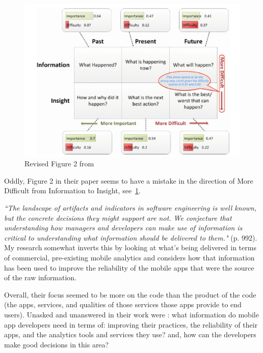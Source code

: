 \begin{figure}
    \centering
    \includegraphics[width=\linewidth]{images/related-work/buse2012-edited-figure-2.pdf}
    \caption[Analytical questions, adapted from \cite{buse2012_information_needs_for_software_development_analytics}]{Revised Figure 2 from \cite{buse2012_information_needs_for_software_development_analytics}}
    \label{fig:buse2012-edited-figure-2}
\end{figure}

Oddly, Figure 2 in their paper seems to have a mistake in the direction of More Difficult from Information to Insight, see~\ref{fig:buse2012-edited-figure-2}.

\emph{``The landscape of artifacts and indicators in software engineering is well known, but the concrete decisions they might support are not. We conjecture that understanding how managers and developers can make use of information is critical to understanding what information should be delivered to them."} (p. 992). 
My research somewhat inverts this by looking at what's being delivered in terms of commercial, pre-existing mobile analytics and considers how that information has been used to improve the reliability of the mobile apps that were the source of the raw information.

Overall, their focus seemed to be more on the code than the product of the code (the apps, services, and qualities of those services those apps provide to end users). Unasked and unanswered in their work were : what information do mobile app developers need in terms of: improving their practices, the reliability of their apps, and the analytics tools and services they use? and, how can the developers make good decisions in this area?

